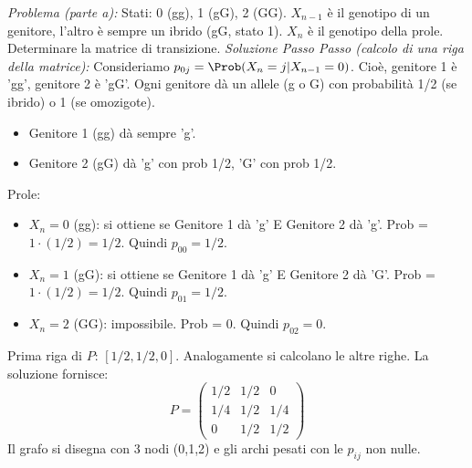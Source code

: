 \begin{example}
\textit{Problema (parte a):} Stati: 0 (gg), 1 (gG), 2 (GG). $X_{n-1}$ è il genotipo di un genitore, l'altro è sempre un ibrido (gG, stato 1). $X_n$ è il genotipo della prole. Determinare la matrice di transizione.
\textit{Soluzione Passo Passo (calcolo di una riga della matrice):}
Consideriamo $p_{0j} = \Prob(X_n=j | X_{n-1}=0)$. Cioè, genitore 1 è 'gg', genitore 2 è 'gG'.
Ogni genitore dà un allele (g o G) con probabilità 1/2 (se ibrido) o 1 (se omozigote).
\begin{itemize}
    \item Genitore 1 (gg) dà sempre 'g'.
    \item Genitore 2 (gG) dà 'g' con prob 1/2, 'G' con prob 1/2.
\end{itemize}
Prole:
\begin{itemize}
    \item $X_n=0$ (gg): si ottiene se Genitore 1 dà 'g' E Genitore 2 dà 'g'. Prob = $1 \cdot (1/2) = 1/2$. Quindi $p_{00}=1/2$.
    \item $X_n=1$ (gG): si ottiene se Genitore 1 dà 'g' E Genitore 2 dà 'G'. Prob = $1 \cdot (1/2) = 1/2$. Quindi $p_{01}=1/2$.
    \item $X_n=2$ (GG): impossibile. Prob = 0. Quindi $p_{02}=0$.
\end{itemize}
Prima riga di $P$: $[1/2, 1/2, 0]$.
Analogamente si calcolano le altre righe. La soluzione fornisce:
\[ P = \begin{pmatrix} 1/2 & 1/2 & 0 \\ 1/4 & 1/2 & 1/4 \\ 0 & 1/2 & 1/2 \end{pmatrix} \]
Il grafo si disegna con 3 nodi (0,1,2) e gli archi pesati con le $p_{ij}$ non nulle.
\end{example}


